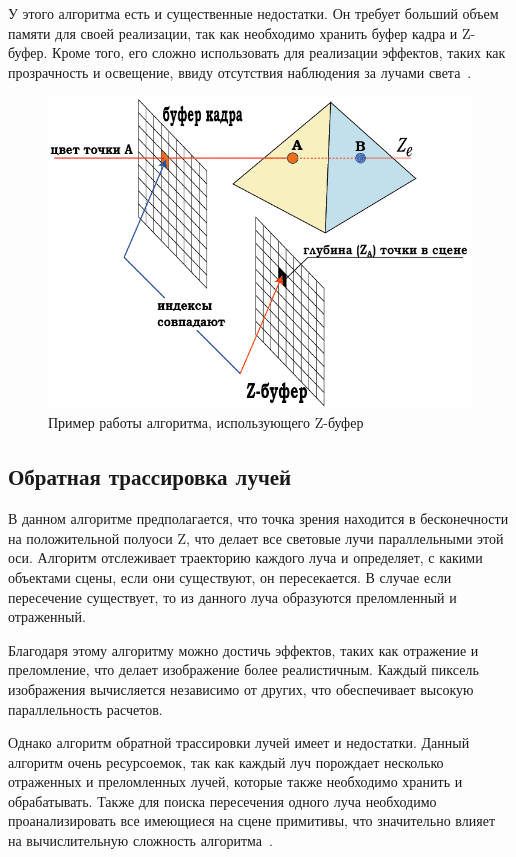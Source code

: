 У этого алгоритма есть и существенные недостатки. 
Он требует больший объем памяти для своей реализации, так как необходимо хранить буфер кадра и Z-буфер.
Кроме того, его сложно использовать для реализации эффектов, таких как прозрачность и освещение, ввиду отсутствия 
наблюдения за лучами света~\cite{Rodgers}.

\begin{figure}[H]
	\centering
	\includegraphics[scale=0.67]{images/z_buf.png}
	\caption{Пример работы алгоритма, использующего Z-буфер}
	\label{fig:zbuf}
\end{figure}

\subsection{Обратная трассировка лучей}
В данном алгоритме предполагается, что точка зрения находится в бесконечности на положительной полуоси Z, что делает все световые лучи параллельными этой оси. 
Алгоритм отслеживает траекторию каждого луча и определяет, с какими объектами сцены, если они существуют, он пересекается.
В случае если пересечение существует, то из данного луча образуются преломленный и отраженный.

Благодаря этому алгоритму можно достичь эффектов, таких как отражение и преломление, что делает изображение более реалистичным. 
Каждый пиксель изображения вычисляется независимо от других, что обеспечивает высокую параллельность расчетов.

Однако алгоритм обратной трассировки лучей имеет и недостатки.
Данный алгоритм очень ресурсоемок, так как каждый луч порождает несколько отраженных и преломленных лучей, которые также необходимо хранить и обрабатывать.
Также для поиска пересечения одного луча необходимо проанализировать все имеющиеся на сцене примитивы, что значительно влияет на вычислительную сложность алгоритма~\cite{Rodgers}.

